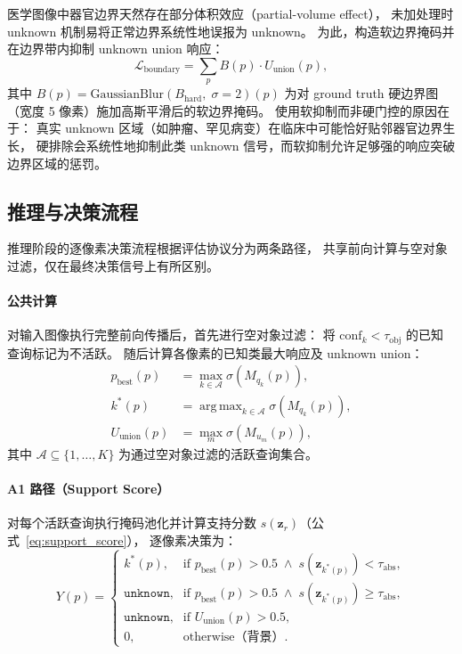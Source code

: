 \documentclass[3p,twocolumn,authoryear]{elsarticle}
\newcommand{\bz}{\mathbf{z}}                              %
\newcommand{\tobj}{\tau_{\text{obj}}}                     %
\newcommand{\tabs}{\tau_{\text{abs}}}                     %
\DeclareMathOperator*{\argmax}{arg\,max}
\begin{document}
医学图像中器官边界天然存在部分体积效应（partial-volume effect），
未加处理时 unknown 机制易将正常边界系统性地误报为 unknown。
为此，构造软边界掩码并在边界带内抑制 unknown union 响应：
\begin{equation}\label{eq:loss_boundary}
  \mathcal{L}_{\text{boundary}} = \sum_{p} B(p) \cdot U_{\text{union}}(p),
\end{equation}
其中 $B(p) = \text{GaussianBlur}(B_{\text{hard}},\; \sigma=2)(p)$ 为对 ground truth 硬边界图
（宽度 5 像素）施加高斯平滑后的软边界掩码。
使用软抑制而非硬门控的原因在于：
真实 unknown 区域（如肿瘤、罕见病变）在临床中可能恰好贴邻器官边界生长，
硬排除会系统性地抑制此类 unknown 信号，而软抑制允许足够强的响应突破边界区域的惩罚。

\subsection{推理与决策流程}\label{sec:method:inference}

推理阶段的逐像素决策流程根据评估协议分为两条路径，
共享前向计算与空对象过滤，仅在最终决策信号上有所区别。

\paragraph{公共计算}
对输入图像执行完整前向传播后，首先进行空对象过滤：
将 $\text{conf}_k < \tobj$ 的已知查询标记为不活跃。
随后计算各像素的已知类最大响应及 unknown union：
\begin{align}
  p_{\text{best}}(p) &= \max_{k \in \mathcal{A}} \sigma\!\left(M_{q_k}(p)\right), \label{eq:best_prob} \\
  k^*(p) &= \argmax_{k \in \mathcal{A}} \sigma\!\left(M_{q_k}(p)\right), \label{eq:best_idx} \\
  U_{\text{union}}(p) &= \max_{m} \sigma\!\left(M_{u_m}(p)\right), \label{eq:u_union_infer}
\end{align}
其中 $\mathcal{A} \subseteq \{1, \ldots, K\}$ 为通过空对象过滤的活跃查询集合。

\paragraph{A1 路径（Support Score）}
对每个活跃查询执行掩码池化并计算支持分数 $s(\bz_r)$（公式~\eqref{eq:support_score}），
逐像素决策为：
\begin{equation}\label{eq:decision_a1}
  Y(p) = \begin{cases}
    k^*(p),           & \text{if } p_{\text{best}}(p) > 0.5 \;\wedge\; s(\bz_{k^*(p)}) < \tabs, \\
    \texttt{unknown}, & \text{if } p_{\text{best}}(p) > 0.5 \;\wedge\; s(\bz_{k^*(p)}) \geq \tabs, \\
    \texttt{unknown}, & \text{if } U_{\text{union}}(p) > 0.5, \\
    0,                & \text{otherwise（背景）}.
  \end{cases}
\end{equation}
\end{document}
